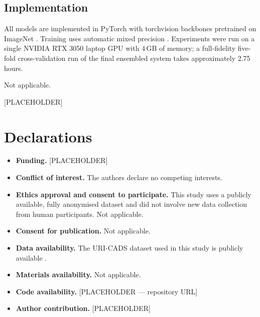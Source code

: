 \documentclass[pdflatex,sn-mathphys-num]{sn-jnl}
\theoremstyle{thmstyleone}%
\theoremstyle{thmstyletwo}%
\theoremstyle{thmstylethree}%
\begin{document}
\subsection{Implementation}\label{subsec:implementation}

All models are implemented in PyTorch \cite{bib_pytorch} with torchvision backbones pretrained
on ImageNet \cite{bib_imagenet}. Training uses automatic mixed precision \cite{bib_amp}. Experiments were run on
a single NVIDIA RTX 3050 laptop GPU with 4\,GB of memory; a full-fidelity five-fold
cross-validation run of the final ensembled system takes approximately 2.75 hours.

\backmatter


Not applicable.


[PLACEHOLDER]

\section*{Declarations}

\begin{itemize}
\item \textbf{Funding.} [PLACEHOLDER]
\item \textbf{Conflict of interest.} The authors declare no competing interests.
\item \textbf{Ethics approval and consent to participate.} This study uses a publicly available,
fully anonymised dataset and did not involve new data collection from human participants.
Not applicable.
\item \textbf{Consent for publication.} Not applicable.
\item \textbf{Data availability.} The URI-CADS dataset used in this study is publicly available
\cite{bib_uricads}.
\item \textbf{Materials availability.} Not applicable.
\item \textbf{Code availability.} [PLACEHOLDER --- repository URL]
\item \textbf{Author contribution.} [PLACEHOLDER]
\end{itemize}


\end{document}
